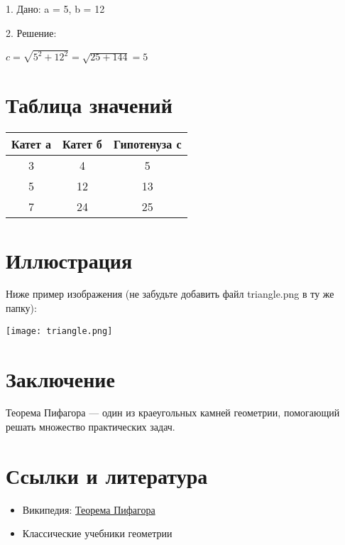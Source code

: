 \documentclass{article}
\begin{document}
1. Дано: a = 5, b = 12

2. Решение:
\begin{center}

  \text $ c = \sqrt{5^2 + 12^2} = \sqrt{25 + 144} = 5$
\end{center}
\section{Таблица значений}
\begin{center}
\begin{tabular}{|c|c|c|}
\hline
Катет а & Катет б & Гипотенуза с \\
\hline
3 & 4 & 5 \\
\hline
5 & 12 & 13 \\
\hline
7 & 24 & 25 \\
\hline
\end{tabular}
\end{center}

\section{Иллюстрация}
Ниже пример изображения (не забудьте добавить файл triangle.png в ту же папку):

\begin{center}
\texttt{[image: triangle.png]}
\end{center}


\section{Заключение}

Теорема Пифагора — один из краеугольных камней геометрии, помогающий решать
множество практических задач.


\section{Ссылки и литература}
\begin{itemize}
    \item Википедия: \href{https://ru.wikipedia.org/wiki/%D0%A2%D0%B5%D0%BE%D1%80%D0%B5%D0%BC%D0%B0_%D0%9F%D0%B8%D1%84%D0%B0%D0%B3%D0%BE%D1%80%D0%B0}{ Теорема Пифагора}
    \item Классические учебники геометрии

\end{itemize}
\end{document}
